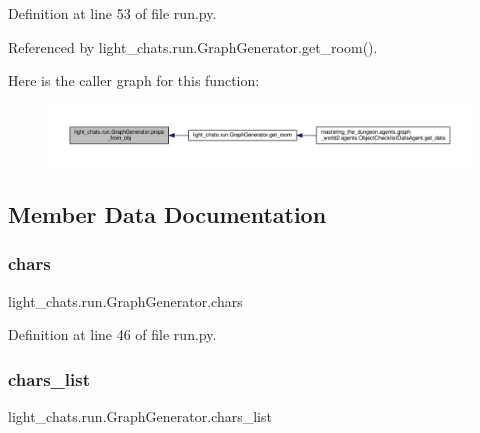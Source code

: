 Definition at line 53 of file run.\+py.



Referenced by light\+\_\+chats.\+run.\+Graph\+Generator.\+get\+\_\+room().

Here is the caller graph for this function\+:
\nopagebreak
\begin{figure}[H]
\begin{center}
\leavevmode
\includegraphics[width=350pt]{classlight__chats_1_1run_1_1GraphGenerator_a757544b95a6b132d89a0e27dc98511f4_icgraph}
\end{center}
\end{figure}


\subsection{Member Data Documentation}
\mbox{\label{classlight__chats_1_1run_1_1GraphGenerator_a3a7d4254e7381805d70735c33110e488}} 
\subsubsection{\texorpdfstring{chars}{chars}}
{\footnotesize\ttfamily light\+\_\+chats.\+run.\+Graph\+Generator.\+chars}



Definition at line 46 of file run.\+py.

\mbox{\label{classlight__chats_1_1run_1_1GraphGenerator_adb64c1437325f8797b0d6a7cdd9d6692}} 
\subsubsection{\texorpdfstring{chars\+\_\+list}{chars\_list}}
{\footnotesize\ttfamily light\+\_\+chats.\+run.\+Graph\+Generator.\+chars\+\_\+list}



